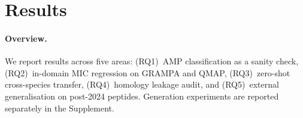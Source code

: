 \section{Results}

\paragraph{Overview.}
We report results across five areas:
(RQ1)~AMP classification as a sanity check,
(RQ2)~in-domain MIC regression on GRAMPA and QMAP,
(RQ3)~zero-shot cross-species transfer,
(RQ4)~homology leakage audit, and
(RQ5)~external generalisation on post-2024 peptides.
Generation experiments are reported separately in the Supplement.












%
%
%
%
